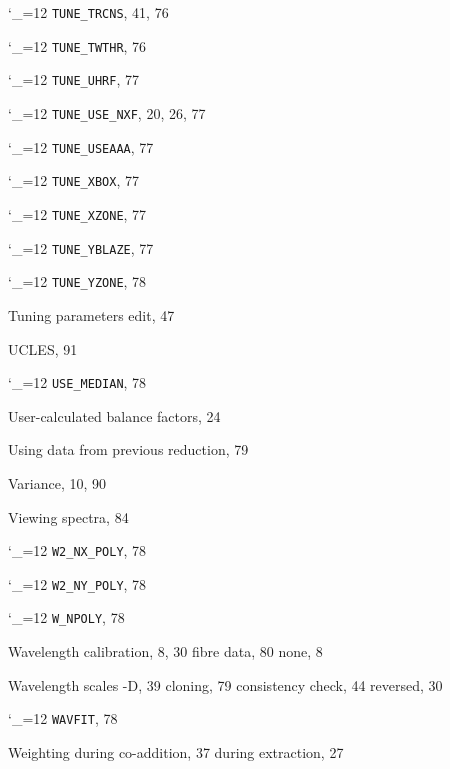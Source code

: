 \documentclass[11pt,twoside]{article}
\newcommand{\cmdname}{\begingroup \catcode`\_=12 \realcmdname}
\newcommand{\realcmdname}[1]{\endgroup\texttt{#1}}
\begin{document}
\begin{theindex}
  \item \cmdname {TUNE_TRCNS}, 41, 76
  \item \cmdname {TUNE_TWTHR}, 76
  \item \cmdname {TUNE_UHRF}, 77
  \item \cmdname {TUNE_USE_NXF}, 20, 26, 77
  \item \cmdname {TUNE_USEAAA}, 77
  \item \cmdname {TUNE_XBOX}, 77
  \item \cmdname {TUNE_XZONE}, 77
  \item \cmdname {TUNE_YBLAZE}, 77
  \item \cmdname {TUNE_YZONE}, 78
  \item Tuning parameters
    \subitem edit, 47

  \indexspace

  \item UCLES, 91
  \item \cmdname {USE_MEDIAN}, 78
  \item User-calculated balance factors, 24
  \item Using data from previous reduction, 79

  \indexspace

  \item Variance, 10, 90
  \item Viewing spectra, 84

  \indexspace

  \item \cmdname {W2_NX_POLY}, 78
  \item \cmdname {W2_NY_POLY}, 78
  \item \cmdname {W_NPOLY}, 78
  \item Wavelength calibration, 8, 30
    \subitem fibre data, 80
    \subitem none, 8
  \item Wavelength scales
    -D, 39
    \subitem cloning, 79
    \subitem consistency check, 44
    \subitem reversed, 30
  \item \cmdname {WAVFIT}, 78
  \item Weighting
    \subitem during co-addition, 37
    \subitem during extraction, 27

\end{theindex}
\end{document}
